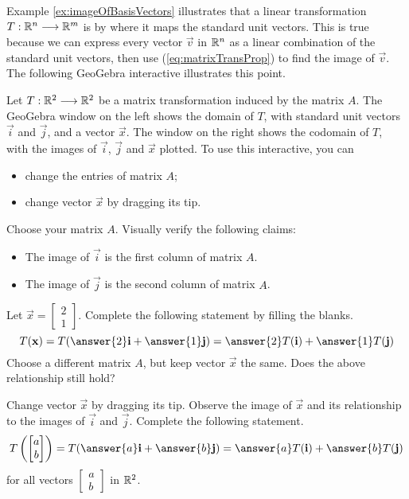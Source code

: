 \documentclass{ximera}
\begin{document}
Example \ref{ex:imageOfBasisVectors} illustrates that a linear transformation $T:\mathbb{R}^n\longrightarrow\mathbb{R}^m$ is  by where it maps the standard unit vectors.  This is true because we can express every vector $\vec{v}$ in $\mathbb{R}^n$ as a linear combination of the standard unit vectors, then use (\ref{eq:matrixTransProp}) to find the image of $\vec{v}$.  The following GeoGebra interactive illustrates this point.
\begin{exploration}\label{exp:linCombStUnitVectors}
Let $T:\mathbb{R}^2\longrightarrow \mathbb{R}^2$ be a matrix transformation induced by the matrix $A$.  The GeoGebra window on the left shows the domain of $T$, with standard unit vectors $\vec{i}$ and $\vec{j}$, and a vector $\vec{x}$.  The window  on the right shows the codomain of $T$, with the images of $\vec{i}$, $\vec{j}$ and $\vec{x}$ plotted.  To use this interactive, you can 
\begin{itemize}
    \item change the entries of matrix $A$;
    \item change vector $\vec{x}$ by dragging its tip.
\end{itemize}
\begin{center}
\end{center}
Choose your matrix $A$.  Visually verify the following claims:
\begin{itemize}
    \item The image of $\vec{i}$ is the first column of matrix $A$.
    \item The image of $\vec{j}$ is the second column of matrix $A$.
\end{itemize}
Let $\vec{x}=\begin{bmatrix}2\\1\end{bmatrix}$.  Complete the following statement by filling the blanks.
$$T(\vec{x})=T(\answer{2}\vec{i}+\answer{1}\vec{j})=\answer{2}T(\vec{i})+\answer{1}T(\vec{j})$$
Choose a different matrix $A$, but keep vector $\vec{x}$ the same.  Does the above relationship still hold?

Change vector $\vec{x}$ by dragging its tip.  Observe the image of $\vec{x}$ and its relationship to the images of $\vec{i}$ and $\vec{j}$.  Complete the following statement.
$$T\left(\begin{bmatrix}a\\b\end{bmatrix}\right)=T(\answer{a}\vec{i}+\answer{b}\vec{j})=\answer{a}T(\vec{i})+\answer{b}T(\vec{j})$$
for all vectors $\begin{bmatrix}a\\b\end{bmatrix}$ in $\mathbb{R}^2$.

\end{exploration}
\end{document}
